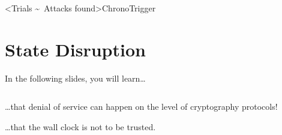\interlude[2]<Trials \textasciitilde\ Attacks found>{ChronoTrigger}
\hypertarget{state-disruption}{%
\section{State Disruption}\label{state-disruption}}

\begin{frame}{In the following slides, you will learn…}
\hypertarget{you-will-learn-hybrid}{}
\begin{columns}[fullwidth]
  \begin{column}{.58\linewidth}
    …that denial of service can happen on the level of cryptography protocols!

    \vspace{2em}
    …that the wall clock is not to be trusted.


\end{column}
\end{columns}
\end{frame}
